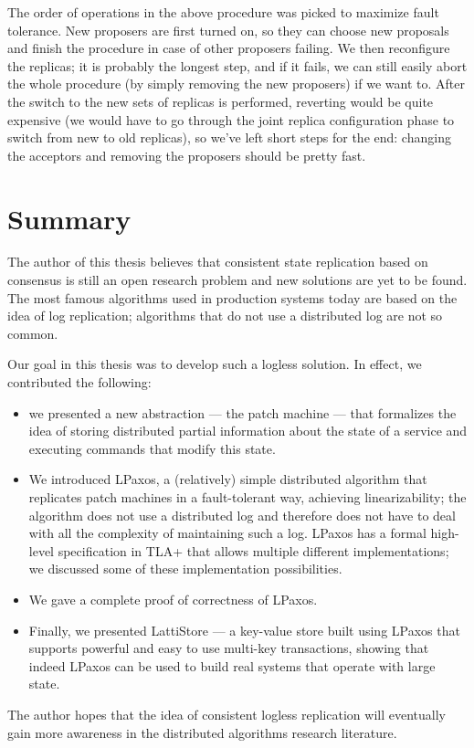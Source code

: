 \documentclass[12pt,a4paper,en]{pracamgr}
\begin{document}
The order of operations in the above procedure was picked to maximize fault tolerance. New proposers are first turned on, so they can choose new proposals and finish the procedure in case of other proposers failing. We then reconfigure the replicas; it is probably the longest step, and if it fails, we can still easily abort the whole procedure (by simply removing the new proposers) if we want to. After the switch to the new sets of replicas is performed, reverting would be quite expensive (we would have to go through the joint replica configuration phase to switch from new to old replicas), so we've left short steps for the end: changing the acceptors and removing the proposers should be pretty fast.

\chapter{Summary}

The author of this thesis believes that consistent state replication based on consensus is still an open research problem and new solutions are yet to be found. The most famous algorithms used in production systems today are based on the idea of log replication; algorithms that do not use a distributed log are not so common.

Our goal in this thesis was to develop such a logless solution. In effect, we contributed the following:
\begin{itemize}
    \item we presented a new abstraction --- the patch machine --- that formalizes the idea of storing distributed partial information about the state of a service and executing commands that modify this state.
    \item We introduced LPaxos, a (relatively) simple distributed algorithm that replicates patch machines in a fault-tolerant way, achieving linearizability; the algorithm does not use a distributed log and therefore does not have to deal with all the complexity of maintaining such a log. LPaxos has a formal high-level specification in TLA+ that allows multiple different implementations; we discussed some of these implementation possibilities.
    \item We gave a complete proof of correctness of LPaxos.
    \item Finally, we presented LattiStore --- a key-value store built using LPaxos that supports powerful and easy to use multi-key transactions, showing that indeed LPaxos can be used to build real systems that operate with large state.
\end{itemize}

The author hopes that the idea of consistent logless replication will eventually gain more awareness in the distributed algorithms research literature.



\end{document}

